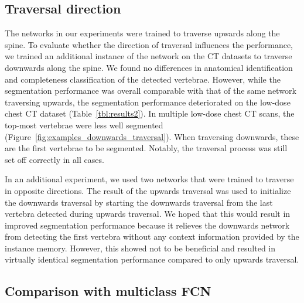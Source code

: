 \documentclass[authoryear,5p,final,times]{elsarticle}
\begin{document}
	\subsection{Traversal direction}
	
	The networks in our experiments were trained to traverse upwards along the spine. To evaluate whether the direction of traversal influences the performance, we trained an additional instance of the network on the CT datasets to traverse downwards along the spine. We found no differences in anatomical identification and completeness classification of the detected vertebrae. However, while the segmentation performance was overall comparable with that of the same network traversing upwards, the segmentation performance deteriorated on the low-dose chest CT dataset (Table~\ref*{tbl:results2}). In multiple low-dose chest CT scans, the top-most vertebrae were less well segmented (Figure~\ref*{fig:examples_downwards_traversal}). When traversing downwards, these are the first vertebrae to be segmented. Notably, the traversal process was still set off correctly in all cases.
	
	In an additional experiment, we used two networks that were trained to traverse in opposite directions. The result of the upwards traversal was used to initialize the downwards traversal by starting the downwards traversal from the last vertebra detected during upwards traversal. We hoped that this would result in improved segmentation performance because it relieves the downwards network from detecting the first vertebra without any context information provided by the instance memory. However, this showed not to be beneficial and resulted in virtually identical segmentation performance compared to only upwards traversal.
	
	\subsection{Comparison with multiclass FCN}
	
\end{document}
